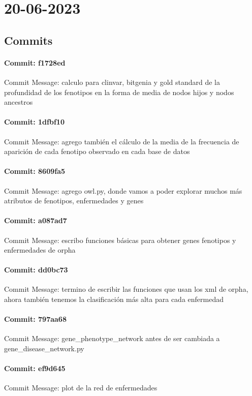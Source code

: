 \documentclass{article}
\begin{document}
\section{20-06-2023}
\subsection{Commits}
\paragraph{Commit: f1728ed}
Commit Message: calculo para clinvar, bitgenia y gold standard de la profundidad de los fenotipos en la forma de media de nodos hijos y nodos ancestros

\paragraph{Commit: 1dfbf10}
Commit Message: agrego también el cálculo de la media de la frecuencia de aparición de cada fenotipo observado en cada base de datos

\paragraph{Commit: 8609fa5}
Commit Message: agrego owl.py, donde vamos a poder explorar muchos más atributos de fenotipos, enfermedades y genes

\paragraph{Commit: a087ad7}
Commit Message: escribo funciones básicas para obtener genes fenotipos y enfermedades de orpha

\paragraph{Commit: dd0bc73}
Commit Message: termino de escribir las funciones que usan los xml de orpha, ahora también tenemos la clasificación más alta para cada enfermedad

\paragraph{Commit: 797aa68}
Commit Message: gene_phenotype_network antes de ser cambiada a gene_disease_network.py

\paragraph{Commit: ef9d645}
Commit Message: plot de la red de enfermedades
\end{document}
